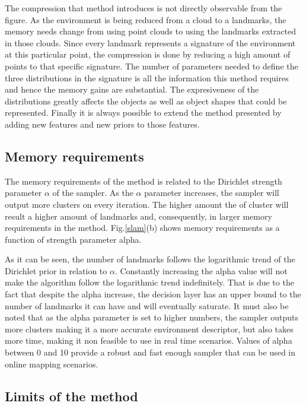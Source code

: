\documentclass[]{article}
\begin{document}
    The compression that method introduces is not directly observable from the figure. As the environment is being reduced from a cloud to a landmarks, the memory needs change from using point clouds to using the landmarks extracted in those clouds. Since every landmark represents a signature of the environment at this particular point, the compression is done by reducing a high amount of points to that specific signature. The number of parameters needed to define the three distributions in the signature is all the information this method requires and hence the memory gains are substantial. The expresiveness of the distributions greatly affects the objects as well as object shapes that could be represented. Finally it is always possible to extend the method presented by adding new features and new priors to those features.


    \subsection{Memory requirements}

    The memory requirements of the method is related to the Dirichlet strength parameter $\alpha$ of the sampler. As the $\alpha$ parameter increases, the sampler will output more clusters on every iteration. The higher amount the of cluster will result a higher amount of landmarks and, consequently, in larger memory requirements in the method. Fig.\ref{slam}(b) shows memory requirements as a function of strength parameter alpha.

    As it can be seen, the number of landmarks follows the logarithmic trend of the Dirichlet prior in relation to $\alpha$. Constantly increasing the alpha value will not make the algorithm follow the logarithmic trend indefinitely. That is due to the fact that despite the alpha increase, the decision layer has an upper bound to the number of landmarks it can have and will eventually saturate. It must also be noted that as the alpha parameter is set to higher numbers, the sampler outputs more clusters making it a more accurate environment descriptor, but also takes more time, making it non feasible to use in real time scenarios. Values of alpha between 0 and 10 provide a robust and fast enough sampler that can be used in online mapping scenarios.

    \subsection{Limits of the method}
\end{document}
